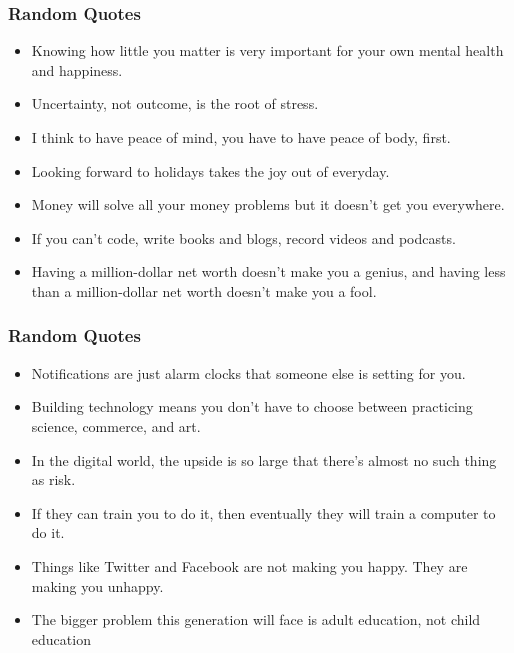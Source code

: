 \begin{frame}[fragile]\frametitle{ Random Quotes}

\begin{itemize}
\item Knowing how little you matter is very important for your own mental
health and happiness.

\item Uncertainty, not outcome, is the root of stress.

\item I think to have peace of mind, you have to have peace of body, first.

\item Looking forward to holidays takes the joy out of everyday.

\item Money will solve all your money problems but it doesn’t get you
everywhere.

\item If you can’t code, write books and blogs, record videos and podcasts.

\item Having a million-dollar net worth doesn’t make you a genius, and
having less than a million-dollar net worth doesn’t make you a fool.
\end{itemize}

\end{frame}

\begin{frame}[fragile]\frametitle{ Random Quotes}

\begin{itemize}
\item Notifications are just alarm clocks that someone else is setting for
you.
\item Building technology means you don’t have to choose between
practicing science, commerce, and art.
\item In the digital world, the upside is so large that there’s almost no such
thing as risk.
\item If they can train you to do it, then eventually they will train a computer
to do it.
\item  Things like Twitter and Facebook are not making you happy.
They are making you unhappy.

\item The bigger problem this generation will face is adult education, not
child education
\end{itemize}

\end{frame}

